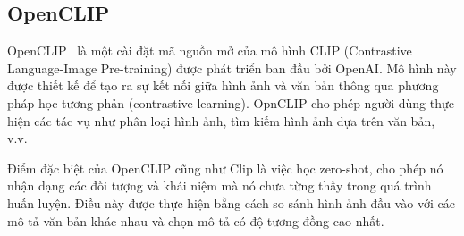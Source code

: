\subsection{OpenCLIP}
\label{sec:open_clip}


OpenCLIP~\cite{openclip} là một cài đặt mã nguồn mở của mô hình CLIP (Contrastive Language-Image Pre-training) được phát triển ban đầu bởi OpenAI. Mô hình này được thiết kế để tạo ra sự kết nối giữa hình ảnh và văn bản thông qua phương pháp học tương phản (contrastive learning). OpnCLIP cho phép người dùng thực hiện các tác vụ như phân loại hình ảnh, tìm kiếm hình ảnh dựa trên văn bản, v.v.
    



Điểm đặc biệt của OpenCLIP cũng như Clip là việc học zero-shot, cho phép nó nhận dạng các đối tượng và khái niệm mà nó chưa từng thấy trong quá trình huấn luyện. Điều này được thực hiện bằng cách so sánh hình ảnh đầu vào với các mô tả văn bản khác nhau và chọn mô tả có độ tương đồng cao nhất.


